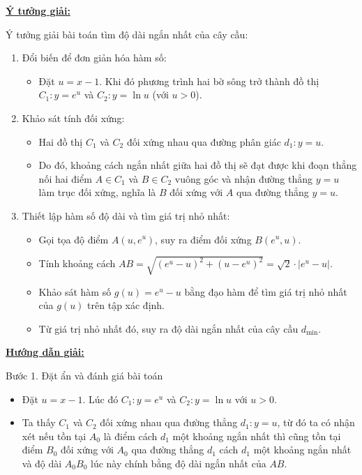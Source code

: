 \documentclass[12pt,a4paper,oneside]{book}
\theoremstyle{theorem}
\theoremstyle{definition}
\begin{document}
         \textbf{\underline{Ý tưởng giải:}}

         Ý tưởng giải bài toán tìm độ dài ngắn nhất của cây cầu:

\begin{enumerate}
    \item Đổi biến để đơn giản hóa hàm số:
    \begin{itemize}
        \item Đặt $u = x - 1$. Khi đó phương trình hai bờ sông trở thành đồ thị $C_1: y = e^u$ và $C_2: y = \ln u$ (với $u > 0$).
    \end{itemize}
    \item Khảo sát tính đối xứng:
    \begin{itemize}
        \item Hai đồ thị $C_1$ và $C_2$ đối xứng nhau qua đường phân giác $d_1: y = u$.
        \item Do đó, khoảng cách ngắn nhất giữa hai đồ thị sẽ đạt được khi đoạn thẳng nối hai điểm $A \in C_1$ và $B \in C_2$ vuông góc và nhận đường thẳng $y = u$ làm trục đối xứng, nghĩa là $B$ đối xứng với $A$ qua đường thẳng $y = u$.
    \end{itemize}
    \item Thiết lập hàm số độ dài và tìm giá trị nhỏ nhất:
    \begin{itemize}
        \item Gọi tọa độ điểm $A(u, e^u)$, suy ra điểm đối xứng $B(e^u, u)$.
        \item Tính khoảng cách $AB = \sqrt{(e^u - u)^2 + (u - e^u)^2} = \sqrt{2} \cdot |e^u - u|$.
        \item Khảo sát hàm số $g(u) = e^u - u$ bằng đạo hàm để tìm giá trị nhỏ nhất của $g(u)$ trên tập xác định.
        \item Từ giá trị nhỏ nhất đó, suy ra độ dài ngắn nhất của cây cầu $d_{\min}$.
    \end{itemize}
\end{enumerate}

         \textbf{\underline{Hướng dẫn giải:}}

Bước 1. Đặt ẩn và đánh giá bài toán
\begin{itemize}
    \item Đặt $u = x - 1$. Lúc đó $C_1: y = e^u$ và $C_2: y = \ln u$ với $u > 0$.
    \item Ta thấy $C_1$ và $C_2$ đối xứng nhau qua đường thẳng $d_1: y = u$, từ đó ta có nhận xét nếu tồn tại $A_0$ là điểm cách $d_1$ một khoảng ngắn nhất thì cũng tồn tại điểm $B_0$ đối xứng với $A_0$ qua đường thẳng $d_1$ cách $d_1$ một khoảng ngắn nhất và độ dài $A_0B_0$ lúc này chính bằng độ dài ngắn nhất của $AB$.
\end{itemize}
\end{document}
